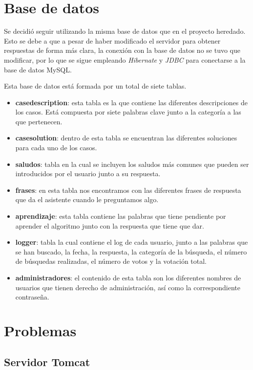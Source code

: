 \section{Base de datos}

Se decidió seguir utilizando la misma base de datos que en el proyecto heredado. Esto se debe a que a pesar de haber modificado el servidor para obtener respuestas de forma más clara, la conexión con la base de datos no se tuvo que modificar, por lo que se sigue empleando \textit{Hibernate} y \textit{JDBC} para conectarse a la base de datos MySQL.

Esta base de datos está formada por un total de siete tablas.

\begin{itemize}
	\tightlist
	\item
	\textbf{casedescription}: esta tabla es la que contiene las diferentes descripciones de los casos. Está compuesta por siete palabras clave junto a la categoría a las que pertenecen.
	\item 
	\textbf{casesolution}: dentro de esta tabla se encuentran las diferentes soluciones para cada uno de los casos.
	\item
	\textbf{saludos}: tabla en la cual se incluyen los saludos más comunes que pueden ser introducidos por el usuario junto a su respuesta.
	\item 
	\textbf{frases}: en esta tabla nos encontramos con las diferentes frases de respuesta que da el asistente cuando le preguntamos algo.
	\item 
	\textbf{aprendizaje}: esta tabla contiene las palabras que tiene pendiente por aprender el algoritmo junto con la respuesta que tiene que dar.
	\item
	\textbf{logger}: tabla la cual contiene el log de cada usuario, junto a las palabras que se han buscado, la fecha, la respuesta, la categoría de la búsqueda, el número de búsquedas realizadas, el número de votos y la votación total.
	\item 
	\textbf{administradores}: el contenido de esta tabla son los diferentes nombres de usuarios que tienen derecho de administración, así como la correspondiente contraseña.
\end{itemize}

\section{Problemas}\label{problemas}
\subsection{Servidor Tomcat}

